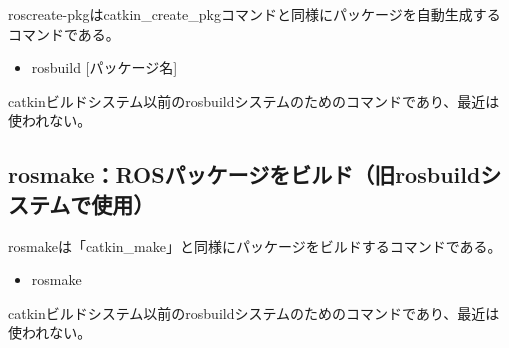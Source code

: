 roscreate-pkgはcatkin\_create\_pkgコマンドと同様にパッケージを自動生成するコマンドである。

\vspace{\baselineskip}
\begin{itemize}
\item  rosbuild [パッケージ名]
\end{itemize}
\vspace{\baselineskip}

catkinビルドシステム以前のrosbuildシステムのためのコマンドであり、最近は使われない。

\subsection{rosmake：ROSパッケージをビルド（旧rosbuildシステムで使用）}

rosmakeは「catkin\_make」と同様にパッケージをビルドするコマンドである。

\vspace{\baselineskip}
\begin{itemize}
\item  rosmake
\end{itemize}
\vspace{\baselineskip}

catkinビルドシステム以前のrosbuildシステムのためのコマンドであり、最近は使われない。

